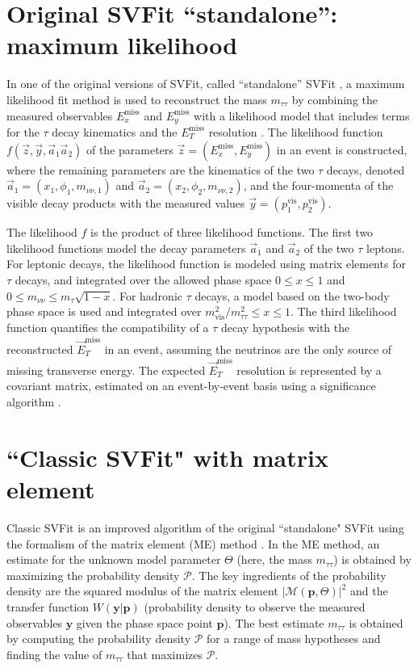 \section{Original SVFit ``standalone'': maximum likelihood}
In one of the original versions of SVFit, called ``standalone'' SVFit \cite{CMS-HIG-13-004}, a maximum likelihood fit method is used to reconstruct the mass $m_{\tau\tau}$ by combining the measured observables $E_{x}^{\text{miss}}$ and $E_{y}^{\text{miss}}$ with a likelihood model that includes terms for the $\tau$ decay kinematics and the $E_{T}^{\text{miss}}$ resolution \cite{CMS-HIG-13-004}. The likelihood function $f(\vec{z}, \vec{y}, \vec{a}_1 \vec{a}_2)$ of the parameters $\vec{z} = (E_{x}^{\text{miss}}, E_{y}^{\text{miss}})$ in an event is constructed, where the remaining parameters are the kinematics of the two $\tau$ decays, denoted $\vec{a}_1 = (x_1, \phi_1, m_{\nu\nu, 1})$ and $\vec{a}_2 = (x_2, \phi_2, m_{\nu\nu, 2})$, and the four-momenta of the visible decay products with the measured values $\vec{y} = (p_1^{\text{vis}}, p_2^{\text{vis}})$.

The likelihood $f$ is the product of three likelihood functions. The first two likelihood functions model the decay parameters $\vec{a}_1$ and $\vec{a}_2$ of the two $\tau$ leptons. For leptonic decays, the likelihood function is modeled using matrix elements for $\tau$ decays, and integrated over the allowed phase space $0 \leq x \leq 1$ and $0 \leq m_{\nu\nu} \leq m_{\tau} \sqrt{1-x}$. For hadronic $\tau$ decays, a model based on the two-body phase space is used and integrated over $m_{\text{vis}}^2/ m_{\tau\tau}^2 \leq x \leq 1$. The third likelihood function quantifies the compatibility of a $\tau$ decay hypothesis with the reconstructed $\vec{E}_{T}^{\text{miss}}$ in an event, assuming the neutrinos are the only source of missing transverse energy. The expected $\vec{E}_{T}^{\text{miss}}$ resolution is represented by a covariant matrix, estimated on an event-by-event basis using a significance algorithm \cite{CMS-JME-10-009}.

\section{``Classic SVFit" with matrix element}
Classic SVFit is an improved algorithm of the original ``standalone" SVFit using the formalism of the matrix element (ME) method \cite{2014_SVFit_Bianchini}. In the ME method, an estimate for the unknown model parameter $\Theta$ (here, the mass $m_{\tau\tau}$) is obtained by maximizing the probability density $\mathcal{P}$. The key ingredients of the probability density are the squared modulus of the matrix element $|\mathcal{M}(\mathbf{p}, \Theta)|^2$ and the transfer function $W(\mathbf{y}|\mathbf{p})$ (probability density to observe the measured observables $\mathbf{y}$ given the phase space point $\mathbf{p}$). The best estimate $m_{\tau\tau}$ is obtained by computing the probability density $\mathcal{P}$ for a range of mass hypotheses and finding the value of $m_{\tau\tau}$ that maximizes $\mathcal{P}$.

